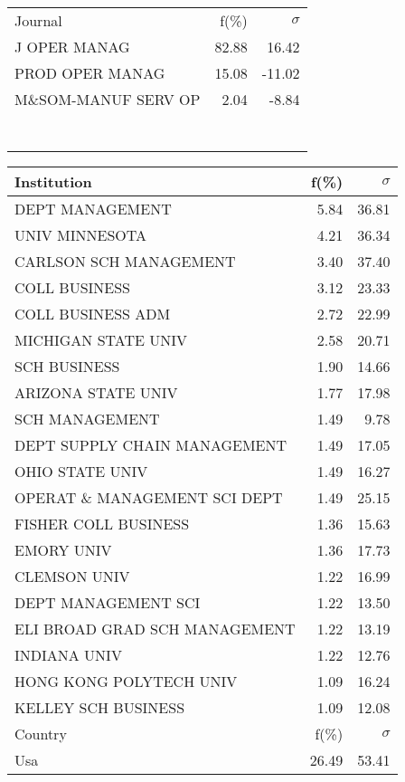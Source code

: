 \documentclass[a4paper,11pt]{report}
\begin{document}
\begin{landscape}
\begin{table}[!ht]
{\begin{tabular}{|l r  r|}
 &  & \\
\hline
\hline
Journal & f(\%) & $\sigma$\\
\hline
J OPER MANAG & 82.88 & 16.42\\
PROD OPER MANAG & 15.08 & -11.02\\
M\&SOM-MANUF SERV OP & 2.04 & -8.84\\
 &  & \\
 &  & \\
 &  & \\
 &  & \\
 &  & \\
 &  & \\
 &  & \\
\hline
\end{tabular}
}
{\scriptsize\begin{tabular}{|l r r|}
\hline
Institution & f(\%) & $\sigma$\\
\hline
DEPT MANAGEMENT & 5.84 & 36.81\\
UNIV MINNESOTA & 4.21 & 36.34\\
CARLSON SCH MANAGEMENT & 3.40 & 37.40\\
COLL BUSINESS & 3.12 & 23.33\\
COLL BUSINESS ADM & 2.72 & 22.99\\
MICHIGAN STATE UNIV & 2.58 & 20.71\\
SCH BUSINESS & 1.90 & 14.66\\
ARIZONA STATE UNIV & 1.77 & 17.98\\
SCH MANAGEMENT & 1.49 & 9.78\\
DEPT SUPPLY CHAIN MANAGEMENT & 1.49 & 17.05\\
OHIO STATE UNIV & 1.49 & 16.27\\
OPERAT \& MANAGEMENT SCI DEPT & 1.49 & 25.15\\
FISHER COLL BUSINESS & 1.36 & 15.63\\
EMORY UNIV & 1.36 & 17.73\\
CLEMSON UNIV & 1.22 & 16.99\\
DEPT MANAGEMENT SCI & 1.22 & 13.50\\
ELI BROAD GRAD SCH MANAGEMENT & 1.22 & 13.19\\
INDIANA UNIV & 1.22 & 12.76\\
HONG KONG POLYTECH UNIV & 1.09 & 16.24\\
KELLEY SCH BUSINESS & 1.09 & 12.08\\
\hline
\hline
Country & f(\%) & $\sigma$\\
\hline
Usa & 26.49 & 53.41\\

\end{tabular}}
\end{table}
\end{landscape}
\end{document}
